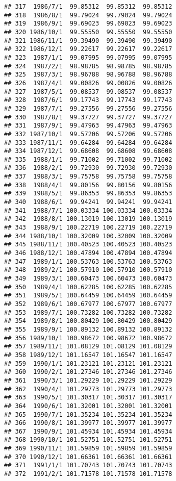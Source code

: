 \documentclass[
]{article}
\begin{document}
\begin{verbatim}
## 317  1986/7/1  99.85312  99.85312  99.85312
## 318  1986/8/1  99.79024  99.79024  99.79024
## 319  1986/9/1  99.69023  99.69023  99.69023
## 320 1986/10/1  99.55550  99.55550  99.55550
## 321 1986/11/1  99.39490  99.39490  99.39490
## 322 1986/12/1  99.22617  99.22617  99.22617
## 323  1987/1/1  99.07995  99.07995  99.07995
## 324  1987/2/1  98.98785  98.98785  98.98785
## 325  1987/3/1  98.96788  98.96788  98.96788
## 326  1987/4/1  99.00826  99.00826  99.00826
## 327  1987/5/1  99.08537  99.08537  99.08537
## 328  1987/6/1  99.17743  99.17743  99.17743
## 329  1987/7/1  99.27556  99.27556  99.27556
## 330  1987/8/1  99.37727  99.37727  99.37727
## 331  1987/9/1  99.47963  99.47963  99.47963
## 332 1987/10/1  99.57206  99.57206  99.57206
## 333 1987/11/1  99.64284  99.64284  99.64284
## 334 1987/12/1  99.68608  99.68608  99.68608
## 335  1988/1/1  99.71002  99.71002  99.71002
## 336  1988/2/1  99.72930  99.72930  99.72930
## 337  1988/3/1  99.75758  99.75758  99.75758
## 338  1988/4/1  99.80156  99.80156  99.80156
## 339  1988/5/1  99.86353  99.86353  99.86353
## 340  1988/6/1  99.94241  99.94241  99.94241
## 341  1988/7/1 100.03334 100.03334 100.03334
## 342  1988/8/1 100.13019 100.13019 100.13019
## 343  1988/9/1 100.22719 100.22719 100.22719
## 344 1988/10/1 100.32009 100.32009 100.32009
## 345 1988/11/1 100.40523 100.40523 100.40523
## 346 1988/12/1 100.47894 100.47894 100.47894
## 347  1989/1/1 100.53763 100.53763 100.53763
## 348  1989/2/1 100.57910 100.57910 100.57910
## 349  1989/3/1 100.60473 100.60473 100.60473
## 350  1989/4/1 100.62285 100.62285 100.62285
## 351  1989/5/1 100.64459 100.64459 100.64459
## 352  1989/6/1 100.67977 100.67977 100.67977
## 353  1989/7/1 100.73282 100.73282 100.73282
## 354  1989/8/1 100.80429 100.80429 100.80429
## 355  1989/9/1 100.89132 100.89132 100.89132
## 356 1989/10/1 100.98672 100.98672 100.98672
## 357 1989/11/1 101.08129 101.08129 101.08129
## 358 1989/12/1 101.16547 101.16547 101.16547
## 359  1990/1/1 101.23121 101.23121 101.23121
## 360  1990/2/1 101.27346 101.27346 101.27346
## 361  1990/3/1 101.29229 101.29229 101.29229
## 362  1990/4/1 101.29773 101.29773 101.29773
## 363  1990/5/1 101.30317 101.30317 101.30317
## 364  1990/6/1 101.32001 101.32001 101.32001
## 365  1990/7/1 101.35234 101.35234 101.35234
## 366  1990/8/1 101.39977 101.39977 101.39977
## 367  1990/9/1 101.45934 101.45934 101.45934
## 368 1990/10/1 101.52751 101.52751 101.52751
## 369 1990/11/1 101.59859 101.59859 101.59859
## 370 1990/12/1 101.66361 101.66361 101.66361
## 371  1991/1/1 101.70743 101.70743 101.70743
## 372  1991/2/1 101.71578 101.71578 101.71578

\end{verbatim}
\end{document}

